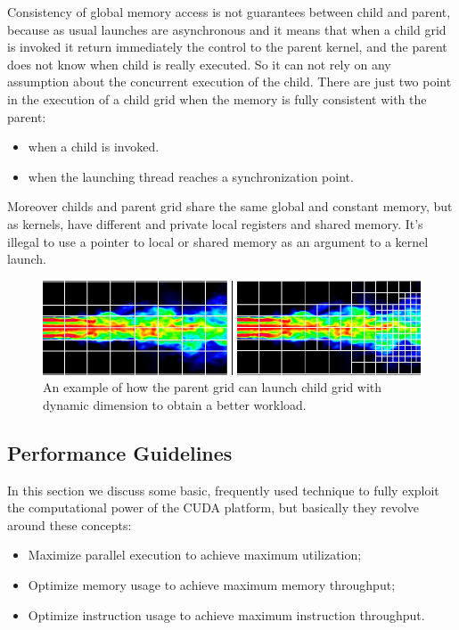 Consistency of global memory access is not guarantees between child and parent,
because as usual launches are asynchronous and it means that when a child grid
is invoked it return immediately the control to the parent kernel, and the
parent does not know when child is really executed.
So it can not rely on any assumption about the concurrent execution of the
child. There are just two point in the execution of a child grid when the memory
is fully consistent with the parent:
\begin{itemize}
  \item when a child is invoked.
  \item when the launching thread reaches a synchronization point.
\end{itemize}

Moreover childs and parent grid share the same global and constant memory, but
as kernels, have different and private local registers and shared memory.
It's illegal to use a pointer to local or shared memory as an argument to a
kernel launch.

\begin{figure}
\centering
\includegraphics[scale=0.7]{./images/dynamicpParallelismWorkload.png}
\caption{An example of how the parent grid can launch
child grid with dynamic dimension to obtain a better
workload.}\label{dynamicpParallelismWorkload.png}
\end{figure}






\FloatBarrier


\subsection{Performance Guidelines}\label{sect:cudaPerfGuideline}
In this section we discuss some basic, frequently used technique to fully exploit
the computational power of the CUDA platform, but basically they revolve around
these concepts:
\begin{itemize}
  \item Maximize parallel execution to achieve maximum utilization;
 \item  Optimize memory usage to achieve maximum memory throughput;
 \item Optimize instruction usage to achieve maximum instruction throughput.
\end{itemize}


